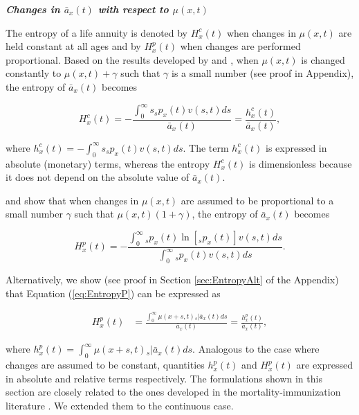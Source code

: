 \documentclass[12pt]{article}
\begin{document}
\textit{\textbf{{Changes in $\bar{a}_x(t)$ with respect to $\mu(x,t)$}}}

The entropy of a life annuity is denoted by ${H}^{c}_{x}(t)$ when changes in $\mu(x,t)$ are held constant at all ages and by ${H}^{p}_{x}(t)$ when changes are performed proportional. Based on the results developed by \citet{Tsai2013a} and \citet{Lin2020}, when $\mu(x,t)$ is changed constantly to $\mu(x,t)+\gamma$ such that $\gamma$ is a small number (see proof in Appendix), the entropy of $\bar{a}_x(t)$ becomes

\begin{equation}\label{eq:EntropyC}
{H}^{c}_{x}(t) = -\frac{\int_{0}^\infty s {}_sp_x(t) {v}(s,t) ds}{\bar{a}_x(t)}=\frac{{h}^{c}_{x}(t)}{\bar{a}_x(t)},
\end{equation}

where ${h}^{c}_{x}(t)=-\int_{0}^\infty s {}_sp_x(t) {v}(s,t) ds$. The term ${h}^{c}_{x}(t)$ is expressed in absolute (monetary) terms, whereas the entropy ${H}^{c}_{x}(t)$ is dimensionless because it does not depend on the absolute value of $\bar{a}_x(t)$.


\citet{Haberman2011} and \citet{Tsai2013a} show that when changes in $\mu(x,t)$ are assumed to be proportional to a small number $\gamma$ such that $\mu(x,t)(1+\gamma)$, the entropy of $\bar{a}_x(t)$ becomes

\begin{equation} \label{eq:EntropyP}
{H}^{p}_{x}(t) = -\frac{ \int_{0}^{\infty}{}_sp_x(t)\ln[{}_sp_x(t)] {v}(s,t) ds}{\int_0^\infty {}_sp_x(t) {v}(s,t) ds}.
\end{equation}


Alternatively, we show (see proof in Section \ref{sec:EntropyAlt} of the Appendix) that Equation (\ref{eq:EntropyP}) can be expressed as

\begin{equation} \label{eq:EntropyP2}
\begin{split}
{H}^{p}_{x}(t) &=  \frac{\int_0^\infty \mu(x+s,t)   {}_s|\bar{a}_x(t) ds}{\bar{a}_x(t)} =  \frac{{h}^{p}_{x}(t)}{\bar{a}_x(t)}, 
\end{split}
\end{equation}

where ${h}^{p}_{x}(t)=\int_0^\infty \mu(x+s,t)   {}_s|\bar{a}_x(t) ds$. Analogous to the case where changes are assumed to be constant, quantities ${h}^{p}_{x}(t)$ and ${H}^{p}_{x}(t)$ are expressed in absolute and relative terms respectively. The formulations shown in this section are closely related to the ones developed in the mortality-immunization literature \citep{Tsai2013a,Lin2020}. We extended them to the continuous case. 
 
\end{document}
